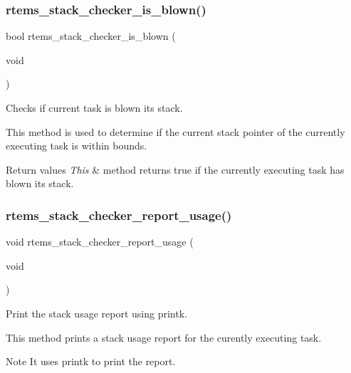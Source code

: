 \subsubsection{\texorpdfstring{rtems\_stack\_checker\_is\_blown()}{rtems\_stack\_checker\_is\_blown()}}
{\footnotesize\ttfamily bool rtems\+\_\+stack\+\_\+checker\+\_\+is\+\_\+blown (\begin{DoxyParamCaption}\item[{void}]{ }\end{DoxyParamCaption})}



Checks if current task is blown its stack. 

This method is used to determine if the current stack pointer of the currently executing task is within bounds.


\begin{DoxyRetVals}{Return values}
{\em This} & method returns true if the currently executing task has blown its stack. \\
\hline
\end{DoxyRetVals}
\mbox{\label{group__libmisc__stackchk_ga8df4c8fbe9071233068782c83dc83fd0}} 
\subsubsection{\texorpdfstring{rtems\_stack\_checker\_report\_usage()}{rtems\_stack\_checker\_report\_usage()}}
{\footnotesize\ttfamily void rtems\+\_\+stack\+\_\+checker\+\_\+report\+\_\+usage (\begin{DoxyParamCaption}\item[{void}]{ }\end{DoxyParamCaption})}



Print the stack usage report using printk. 

This method prints a stack usage report for the curently executing task.

\begin{DoxyNote}{Note}
It uses printk to print the report. 
\end{DoxyNote}
\mbox{\label{group__libmisc__stackchk_ga25ea63d8178d6eb26d2a1148bb03117d}} 
